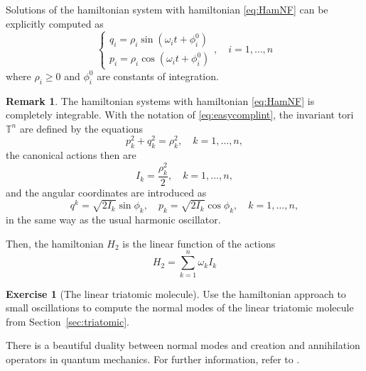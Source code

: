 \documentclass[english,fontsize=11pt,paper=b5]{scrbook}
\numberwithin{equation}{chapter}
\theoremstyle{definition}
\newtheorem{remark}{Remark}[chapter]
\newtheorem{exercise}{Exercise}[chapter]
\begin{document}
      Solutions of the hamiltonian system with hamiltonian \eqref{eq:HamNF} can be explicitly computed as
      \begin{equation}\label{eq:easycomplint}
        \left\lbrace
          \begin{aligned}
            q_i = \rho_i \sin(\omega_it +\phi_i^0) \\
            p_i = \rho_i \cos(\omega_it +\phi_i^0)
          \end{aligned}
        \right .,\quad i=1,\ldots,n
      \end{equation}
      where $\rho_i\geq0$ and $\phi_i^0$ are constants of integration.

      \begin{remark}
        The hamiltonian systems with hamiltonian \eqref{eq:HamNF} is completely integrable.
        With the notation of \eqref{eq:easycomplint}, the invariant tori $\mathbb{T}^n$ are defined by the equations
        \begin{equation}
          p_k^2 + q_k^2 = \rho_k^2, \quad k=1,\ldots,n,
        \end{equation}
        the canonical actions then are
        \begin{equation}
          I_k = \frac{\rho_k^2}2, \quad k=1,\ldots,n,
        \end{equation}
        and the angular coordinates are introduced as
        \begin{equation}
          q^k = \sqrt{2I_k} \sin \phi_k, \quad p_k = \sqrt{2I_k} \cos \phi_k, \quad k=1,\ldots,n,
        \end{equation}
        in the same way as the usual harmonic oscillator.

        Then, the hamiltonian $H_2$ is the linear function of the actions
        \begin{equation}
          H_2 = \sum_{k=1}^n \omega_k I_k
        \end{equation}
      \end{remark}

      \begin{exercise}[The linear triatomic molecule]
        Use the hamiltonian approach to small oscillations to compute the normal modes of the linear triatomic molecule from Section~\ref{sec:triatomic}.
      \end{exercise}

      There is a beautiful duality between normal modes and creation and annihilation operators in quantum mechanics. For further information, refer to \cite[Chapter 2.10]{book:lowenstein}.
\end{document}
